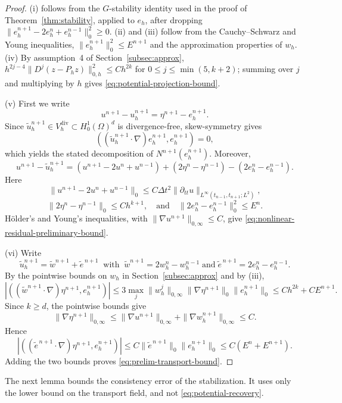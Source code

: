 \documentclass[11pt]{article}
\theoremstyle{remark}\newtheorem{remark}{Remark}
\newcommand{\Vdivh}{V_h^{\mathrm{div}}}
\newcommand{\tu}{\tilde u_h}
\newcommand{\Ph}{P_h}
\theoremstyle{plain}
\newcommand{\new}[1]{{\color{blue}#1}}
\begin{document}
\begin{proof}
\new{(i) follows from the $G$-stability identity used in the proof of Theorem~\ref{thm:stability}, applied to $e_h$, after dropping $\|e_h^{n+1}-2e_h^n+e_h^{n-1}\|_0^2\ge0$. (ii) and (iii) follow from the Cauchy--Schwarz and Young inequalities, $\|e_h^{n+1}\|_0^2\le E^{n+1}$ and the approximation properties of $w_h$. (iv) By assumption~4 of Section~\ref{subsec:approx}, $h^{2j-4}\|D^j(z-\Ph z)\|_{0,h}^2\le Ch^{2k}$ for $0\le j\le\min(5,k+2)$; summing over $j$ and multiplying by $h$ gives \eqref{eq:potential-projection-bound}.}

(v) First we write 
$$
u^{n+1}-u_h^{n+1}=\eta^{n+1}-e_h^{n+1}.
$$ 
Since $\tu^{n+1}\in\Vdivh\subset H_0^1(\Omega)^d$ is divergence-free, \new{skew-symmetry \cite{GR86,Joh16}} gives 
$$((\tu^{n+1}\cdot\nabla)e_h^{n+1},e_h^{n+1})=0,$$ which yields the stated decomposition of $N^{n+1}(e_h^{n+1})$. Moreover,
\begin{equation}\label{eq:transport-error-decomposition}
u^{n+1}-\tu^{n+1}
=(u^{n+1}-2u^n+u^{n-1})
+(2\eta^n-\eta^{n-1})-(2e_h^n-e_h^{n-1}).
\end{equation}
Here 
$$
\|u^{n+1}-2u^n+u^{n-1}\|_0\le C\Delta t^2\|\partial_{tt}u\|_{L^\infty(t_{n-1},t_{n+1};L^2)},
$$
$$\|2\eta^n-\eta^{n-1}\|_0\le Ch^{k+1}, \quad \text{and}\quad  \|2e_h^n-e_h^{n-1}\|_0^2\le E^n.
$$
 H\"older's and Young's inequalities, with $\|\nabla u^{n+1}\|_{0,\infty}\le C$, give \eqref{eq:nonlinear-residual-preliminary-bound}.

(vi) Write 
$$
\tu^{n+1}=\tilde w^{n+1}+\tilde e^{\,n+1}\;\; \text{with}\;\; \tilde w^{n+1}=2w_h^n-w_h^{n-1}
\; \text{and} \; \tilde e^{\,n+1}=2e_h^n-e_h^{n-1}.
 $$ By the pointwise bounds on $w_h$ in Section~\ref{subsec:approx} and by (iii),
\[
|((\tilde w^{n+1}\cdot\nabla)\eta^{n+1},e_h^{n+1})|
\le 3\max_j\|w_h^j\|_{0,\infty}\|\nabla\eta^{n+1}\|_0\|e_h^{n+1}\|_0
\le Ch^{2k}+CE^{n+1}.
\]
Since $k\ge d$, the pointwise bounds give 
$$
\|\nabla\eta^{n+1}\|_{0,\infty}\le\|\nabla u^{n+1}\|_{0,\infty}+\|\nabla w_h^{n+1}\|_{0,\infty}\le C.
$$
Hence
\[
|((\tilde e^{\,n+1}\cdot\nabla)\eta^{n+1},e_h^{n+1})|\le C\|\tilde e^{\,n+1}\|_0\|e_h^{n+1}\|_0\le C(E^n+E^{n+1}).
\]
Adding the two bounds proves \eqref{eq:prelim-transport-bound}.
\end{proof}

The next lemma bounds the consistency error of the stabilization. It uses only the lower bound on the transport field, and not \eqref{eq:potential-recovery}.
\end{document}
